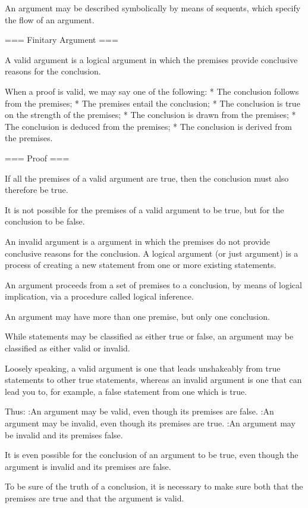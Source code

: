 An argument may be described symbolically by means of sequents, which specify the flow of an argument.


=== Finitary Argument ===

A valid argument is a logical argument in which the premises provide conclusive reasons for the conclusion.


When a proof is valid, we may say one of the following:
* The conclusion follows from the premises;
* The premises entail the conclusion;
* The conclusion is true on the strength of the premises;
* The conclusion is drawn from the premises;
* The conclusion is deduced from the premises;
* The conclusion is derived from the premises.


=== Proof ===

If all the premises of a valid argument are true, then the conclusion must also therefore be true.

It is not possible for the premises of a valid argument to be true, but for the conclusion to be false.


An invalid argument is a argument in which the premises do not provide conclusive reasons for the conclusion.
A logical argument (or just argument) is a process of creating a new statement from one or more existing statements.

An argument proceeds from a set of premises to a conclusion, by means of logical implication, via a procedure called logical inference.


An argument may have more than one premise, but only one conclusion.


While statements may be classified as either true or false, an argument may be classified as either valid or invalid.


Loosely speaking, a valid argument is one that leads unshakeably from true statements to other true statements, whereas an invalid argument is one that can lead you to, for example, a false statement from one which is true.


Thus:
:An argument may be valid, even though its premises are false.
:An argument may be invalid, even though its premises are true.
:An argument may be invalid and its premises false.

It is even possible for the conclusion of an argument to be true, even though the argument is invalid and its premises are false.


To be sure of the truth of a conclusion, it is necessary to make sure both that the premises are true and that the argument is valid.


